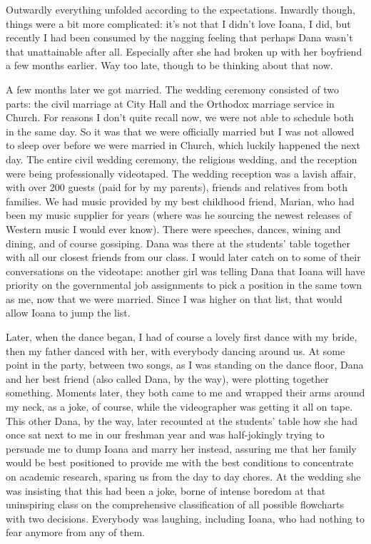 \documentclass[12pt]{book}
\begin{document}
Outwardly everything unfolded according to the expectations. Inwardly
though, things were a bit more complicated: it's not that I didn't love
Ioana, I did, but recently I had been consumed by the nagging feeling
that perhaps Dana wasn't that unattainable after all. Especially after
she had broken up with her boyfriend a few months earlier. Way too late,
though to be thinking about that now.

A few months later we got married. The wedding ceremony consisted of two
parts: the civil marriage at City Hall and the Orthodox marriage service
in Church. For reasons I don't quite recall now, we were not able to
schedule both in the same day. So it was that we were officially married
but I was not allowed to sleep over before we were married in Church,
which luckily happened the next day. The entire civil wedding ceremony,
the religious wedding, and the reception were being professionally
videotaped. The wedding reception was a lavish affair, with over 200
guests (paid for by my parents), friends and relatives from both
families. We had music provided by my best childhood friend, Marian, who
had been my music supplier for years (where was he sourcing the newest
releases of Western music I would ever know). There were speeches,
dances, wining and dining, and of course gossiping. Dana was there at
the students' table together with all our closest friends from our
class. I would later catch on to some of their conversations on the
videotape: another girl was telling Dana that Ioana will have priority
on the governmental job assignments to pick a position in the same town
as me, now that we were married. Since I was higher on that list, that
would allow Ioana to jump the list.

Later, when the dance began, I had of course a lovely first dance with
my bride, then my father danced with her, with everybody dancing around
us. At some point in the party, between two songs, as I was standing on
the dance floor, Dana and her best friend (also called Dana, by the
way), were plotting together something. Moments later, they both came to
me and wrapped their arms around my neck, as a joke, of course, while
the videographer was getting it all on tape. This other Dana, by the
way, later recounted at the students' table how she had once sat next to
me in our freshman year and was half-jokingly trying to persuade me to
dump Ioana and marry her instead, assuring me that her family would be
best positioned to provide me with the best conditions to concentrate on
academic research, sparing us from the day to day chores. At the wedding
she was insisting that this had been a joke, borne of intense boredom at
that uninspiring class on the comprehensive classification of all
possible flowcharts with two decisions. Everybody was laughing,
including Ioana, who had nothing to fear anymore from any of them.
\end{document}
